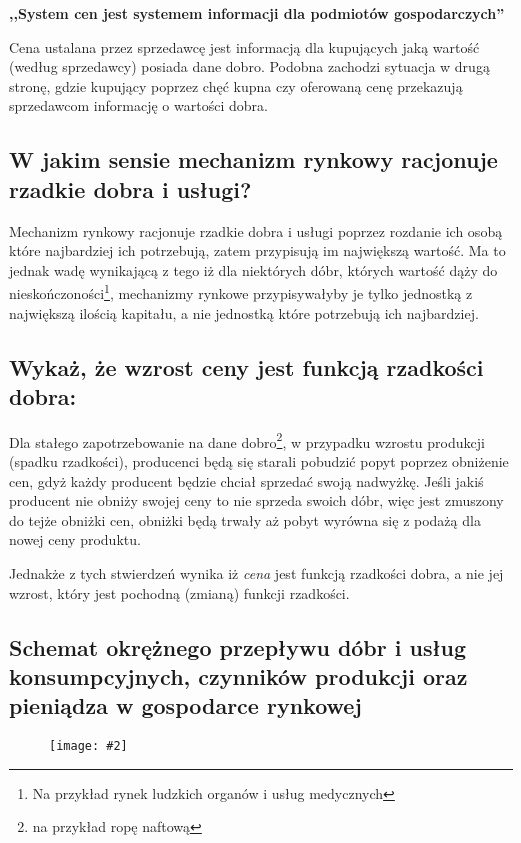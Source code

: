 \documentclass[a4paper,12pt]{article}
\newcommand{\obrazek}[2]{
	\begin{figure}[h]
		\centering
		\texttt{[image: \#2]}
	\end{figure}
}
\begin{document}
\textbf{,,System cen jest systemem informacji dla podmiotów gospodarczych''}

\vspace{.3cm}

Cena ustalana przez sprzedawcę jest informacją dla kupujących jaką wartość (według sprzedawcy) posiada dane dobro. Podobna zachodzi sytuacja w drugą stronę, gdzie kupujący poprzez chęć kupna czy oferowaną cenę przekazują sprzedawcom informację o wartości dobra.

\subsection{W jakim sensie mechanizm rynkowy racjonuje rzadkie dobra i usługi?}

Mechanizm rynkowy racjonuje rzadkie dobra i usługi poprzez rozdanie ich osobą które najbardziej ich potrzebują, zatem przypisują im największą wartość. Ma to jednak wadę wynikającą z tego iż dla niektórych dóbr, których wartość dąży do nieskończoności\footnote{Na przykład rynek ludzkich organów i usług medycznych}, mechanizmy rynkowe przypisywałyby je tylko jednostką z największą ilością kapitału, a nie jednostką które potrzebują ich najbardziej.

\subsection{Wykaż, że wzrost ceny jest funkcją rzadkości dobra:}

Dla stałego zapotrzebowanie na dane dobro\footnote{na przykład ropę naftową}, w przypadku wzrostu produkcji (spadku rzadkości), producenci będą się starali pobudzić popyt poprzez obniżenie cen, gdyż każdy producent będzie chciał sprzedać swoją nadwyżkę. Jeśli jakiś producent nie obniży swojej ceny to nie sprzeda swoich dóbr, więc jest zmuszony do tejże obniżki cen, obniżki będą trwały aż pobyt wyrówna się z podażą dla nowej ceny produktu.

Jednakże z tych stwierdzeń wynika iż \emph{cena} jest funkcją rzadkości dobra, a nie jej wzrost, który jest pochodną (zmianą) funkcji rzadkości.

\subsection{Schemat okrężnego przepływu dóbr i usług konsumpcyjnych, czynników produkcji oraz pieniądza w gospodarce rynkowej}

\obrazek{0.5}{schemat1.png}
\end{document}
